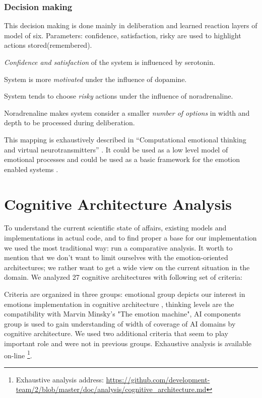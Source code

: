 \subsubsection{Decision making}

This decision making is done mainly in deliberation and learned reaction layers of model of six.
Parameters: confidence, satisfaction, risky are used to highlight actions stored(remembered).

\emph{Confidence and satisfaction} of the system is influenced by serotonin.

System is more \emph{motivated} under the influence of dopamine.

System tends to choose \emph{risky} actions under the influence of noradrenaline.

Noradrenaline makes system consider a smaller \emph{number of options} in width and depth to be processed during deliberation.

This mapping is exhaustively described in ``Computational emotional thinking and virtual neurotransmitters'' \cite{computational_emotional_thinking}. It could be used as a low level model of emotional processes and could be used as a basic framework for the emotion enabled systems \cite{whatdoesitmeanforcomputer}.

\section{Cognitive Architecture Analysis}

To understand the current scientific state of affairs, existing models and implementations in actual code, and to find proper a base for our implementation we used the most traditional way: run a comparative analysis. It worth to mention that we don't want to limit ourselves with the emotion-oriented architectures; we rather want to get a wide view on the current situation in the domain. We analyzed 27 cognitive architectures with following set of criteria:

Criteria are organized in three groups: emotional group depicts our interest in emotions implementation in cognitive architecture \cite{computationalmodelsemotionscognition}, thinking levels are the compatibility with Marvin Minsky's "The emotion machine", AI components group is used to gain understanding of width of coverage of AI domains by cognitive architecture. We used two additional criteria that seem to play important role and were not in previous groups. Exhaustive analysis is available on-line \footnote{Exhaustive analysis address: \url{https://github.com/development-team/2/blob/master/doc/analysis/cognitive_architecture.md}}.

